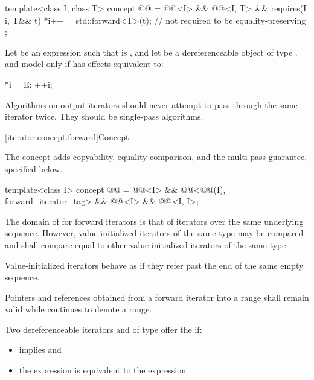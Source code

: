 \begin{codeblock}
template<class I, class T>
  concept @@ =
    @@<I> &&
    @@<I, T> &&
    requires(I i, T&& t) {
      *i++ = std::forward<T>(t);        // not required to be equality-preserving
    };
\end{codeblock}

\pnum
Let  be an expression such that  is , and let  be a
dereferenceable object of type .  and  model  only if
 has effects equivalent to:
\begin{codeblock}
*i = E;
++i;
\end{codeblock}

\pnum
\begin{note}
Algorithms on output iterators should never attempt to pass through the same iterator twice.
They should be single-pass algorithms.
\end{note}

[iterator.concept.forward]{Concept }

\pnum
The  concept adds
copyability, equality comparison, and
the multi-pass guarantee, specified below.

\begin{codeblock}
template<class I>
  concept @@ =
    @@<I> &&
    @@<@@(I), forward_iterator_tag> &&
    @@<I> &&
    @@<I, I>;
\end{codeblock}

\pnum
The domain of \tcode{==} for forward iterators is that of iterators over the same
underlying sequence. However, value-initialized iterators of the same type
may be compared and shall compare equal to other value-initialized iterators of the same type.
\begin{note}
Value-initialized iterators behave as if they refer past the end of the same
empty sequence.
\end{note}

\pnum
Pointers and references obtained from a forward iterator into a range 
shall remain valid while  continues to denote a range.

\pnum
Two dereferenceable iterators  and  of type 
offer the  if:
\begin{itemize}
\item {} implies  and
\item the expression
 is equivalent to the expression .
\end{itemize}

